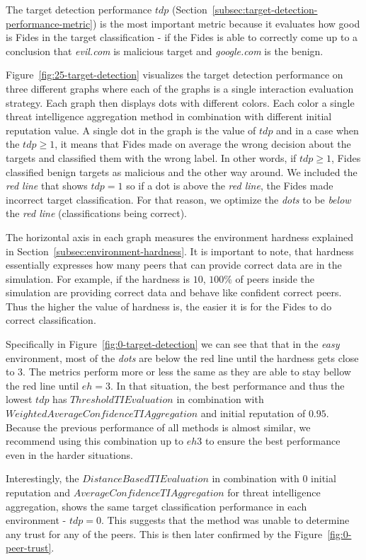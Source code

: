 The target detection performance $tdp$ (Section~\ref{subsec:target-detection-performance-metric}) is the most important metric because it evaluates how good is Fides in the target classification - if the Fides is able to correctly come up to a conclusion that \textit{evil.com} is malicious target and \textit{google.com} is the benign.

Figure~\ref{fig:25-target-detection} visualizes the target detection performance on three different graphs where each of the graphs is a single interaction evaluation strategy.
Each graph then displays dots with different colors. Each color a single threat intelligence aggregation method in combination with different initial reputation value.
A single dot in the graph is the value of $tdp$ and in a case when the $tdp \geq 1$, it means that Fides made on average the wrong decision about the targets and classified them with the wrong label.
In other words, if $tdp \geq 1$, Fides classified benign targets as malicious and the other way around.
We included the \textit{red line} that shows $tdp = 1$ so if a dot is above the \textit{red line}, the Fides made incorrect target classification.
For that reason, we optimize the \textit{dots} to be \textit{below} the \textit{red line} (classifications being correct).

The horizontal axis in each graph measures the environment hardness explained in Section~\ref{subsec:environment-hardness}. It is important to note, that hardness essentially expresses how many peers that can provide correct data are in the simulation. For example, if the hardness is $10$, $100\%$ of peers inside the simulation are providing correct data and behave like confident correct peers.
Thus the higher the value of hardness is, the easier it is for the Fides to do correct classification.

Specifically in Figure~\ref{fig:0-target-detection} we can see that that in the \textit{easy} environment, most of the \textit{dots} are below the red line until the hardness gets close to $3$.
The metrics perform more or less the same as they are able to stay bellow the red line until $eh = 3$. In that situation, the best performance and thus the lowest $tdp$ has $ThresholdTIEvaluation$ in combination with $WeightedAverageConfidenceTIAggregation$ and initial reputation of $0.95$.
Because the previous performance of all methods is almost similar, we recommend using this combination up to $eh 3$ to ensure the best performance even in the harder situations.

Interestingly, the $DistanceBasedTIEvaluation$ in combination with $0$ initial reputation and $AverageConfidenceTIAggregation$ for threat intelligence aggregation, shows the same target classification performance in each environment - $tdp = 0$. This suggests that the method was unable to determine any trust for any of the peers. This is then later confirmed by the Figure~\ref{fig:0-peer-trust}.


